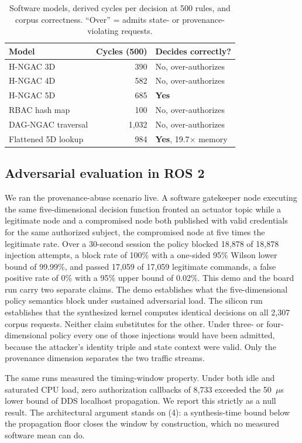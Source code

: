 \documentclass[conference]{IEEEtran}
\begin{document}
\begin{table}[t]
\caption{Software models, derived cycles per decision at 500 rules, and corpus correctness. ``Over'' = admits state- or provenance-violating requests.}
\label{tab:models}
\centering
\begin{tabular}{lrl}
\toprule
Model & Cycles (500) & Decides correctly? \\
\midrule
H-NGAC 3D & 390 & No, over-authorizes \\
H-NGAC 4D & 582 & No, over-authorizes \\
H-NGAC 5D & 685 & \textbf{Yes} \\
RBAC hash map & 100 & No, over-authorizes \\
DAG-NGAC traversal & 1{,}032 & No, over-authorizes \\
Flattened 5D lookup & 984 & \textbf{Yes}, 19.7$\times$ memory \\
\bottomrule
\end{tabular}
\end{table}

\subsection{Adversarial evaluation in ROS 2}

We ran the provenance-abuse scenario live. A software gatekeeper node executing the same five-dimensional decision function fronted an actuator topic while a legitimate node and a compromised node both published with valid credentials for the same authorized subject, the compromised node at five times the legitimate rate. Over a 30-second session the policy blocked 18{,}878 of 18{,}878 injection attempts, a block rate of 100\% with a one-sided 95\% Wilson lower bound of 99.99\%, and passed 17{,}059 of 17{,}059 legitimate commands, a false positive rate of 0\% with a 95\% upper bound of 0.02\%. This demo and the board run carry two separate claims. The demo establishes what the five-dimensional policy semantics block under sustained adversarial load. The silicon run establishes that the synthesized kernel computes identical decisions on all 2{,}307 corpus requests. Neither claim substitutes for the other. Under three- or four-dimensional policy every one of those injections would have been admitted, because the attacker's identity triple and state context were valid. Only the provenance dimension separates the two traffic streams.

The same runs measured the timing-window property. Under both idle and saturated CPU load, zero authorization callbacks of 8{,}733 exceeded the 50~$\mu$s lower bound of DDS localhost propagation. We report this strictly as a null result. The architectural argument stands on (4): a synthesis-time bound below the propagation floor closes the window by construction, which no measured software mean can do.
\end{document}
